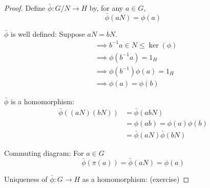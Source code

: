 \documentclass[11pt, oneside]{book}
\theoremstyle{break}
\newtheorem*{proof}{Proof}
\begin{document}
\begin{proof}
    Define $\bar{\phi} : G/N \to H$ by, for any $a \in G$,
    \begin{equation}
        \bar{\phi} (aN) = \phi(a)
    \end{equation}

    $\bar{\phi}$ is well defined: Suppose $aN = bN$.
    \begin{align*}
        &\implies b^{-1}a \in N \leq \ker(\phi) \\
        &\implies \phi(b^{-1} a) = 1_H \\
        &\implies \phi(b^{-1})\phi(a) = 1_H \\
        &\implies \phi(a) = \phi(b)
    \end{align*}

    $\bar{\phi}$ is a homomorphism:
    \begin{align*}
        \bar{\phi} ((aN)(bN)) &= \bar{\phi} (abN) \\
            &= \phi(ab) = \phi(a)\phi(b) \\
            &= \bar{\phi}(aN) \bar{\phi}(bN)
    \end{align*}

    Commuting diagram: For $a \in G$
    \begin{equation}
        \bar{\phi}(\pi(a)) = \bar{\phi} (aN) = \phi(a)
    \end{equation}

    Uniqueness of $\bar{\phi} : G \to H$ as a homomorphism: (exercise)
\end{proof}
\end{document}
